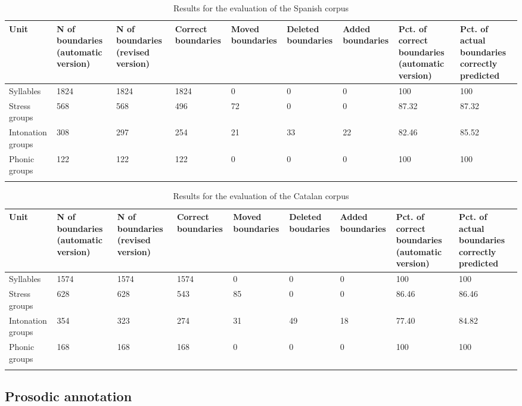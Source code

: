 \documentclass[output=paper]{langsci/langscibook}
\begin{document}
\begin{table}\small
\begin{tabularx}{\textwidth}{X QQQQQQQQ}
\lsptoprule
Unit & N of boundaries (automatic version) & N of boundaries (revised version) & Correct boundaries & Moved boundaries & Deleted boundaries & Added boundaries & Pct. of correct boundaries (automatic version) & Pct. of actual boundaries correctly predicted \\
\midrule
Syllables & 1824 & 1824 & 1824 & 0 & 0 & 0 & 100 & 100 \\
\tablevspace
Stress groups & 568 & 568 & 496 & 72 & 0 & 0 & 87.32 & 87.32 \\
\tablevspace
Intonation groups & 308 & 297 & 254 & 21 & 33 & 22 & 82.46 & 85.52 \\
\tablevspace
Phonic groups & 122 & 122 & 122 & 0 & 0 & 0 & 100 & 100 \\
\lspbottomrule
\end{tabularx}
\caption{Results for the evaluation of the Spanish corpus \citep{Garrido2013SegProso}}
\label{tab:gar:1}
\end{table}

\begin{table}\small
\begin{tabularx}{\textwidth}{Q QQQQQQQQ}
\lsptoprule
Unit & N of boundaries (automatic version) & N of boundaries (revised version) & Correct boundaries & Moved boundaries & Deleted boudaries & Added boundaries & Pct. of correct boundaries (automatic version) & Pct. of actual boundaries correctly predicted \\
\midrule
Syllables & 1574 & 1574 & 1574 & 0 & 0 & 0 & 100 & 100 \\
\tablevspace
Stress groups & 628 & 628 & 543 & 85 & 0 & 0 & 86.46 & 86.46 \\
\tablevspace
Intonation groups & 354 & 323 & 274 & 31 & 49 & 18 & 77.40 & 84.82 \\
\tablevspace
Phonic groups & 168 & 168 & 168 & 0 & 0 & 0 & 100 & 100 \\
\lspbottomrule
\end{tabularx}
\caption{Results for the evaluation of the Catalan corpus \citep{Garrido2013SegProso}}
\label{tab:gar:2}
\end{table}


\subsection{Prosodic annotation} 
\end{document}
